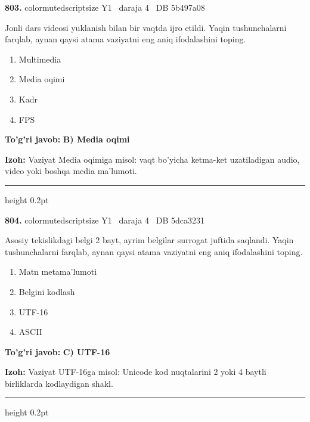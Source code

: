 \documentclass[10pt,a4paper,oneside]{article}
\begin{document}
\noindent\textbf{\color{ink}803.}  {color{muted}scriptsize Y1 \textbullet\ daraja 4 \textbullet\ DB 5b497a08}
\par
Jonli dars videosi yuklanish bilan bir vaqtda ijro etildi. Yaqin tushunchalarni farqlab, aynan qaysi atama vaziyatni eng aniq ifodalashini toping.
\begin{enumerate}[label=\Alph*),leftmargin=9mm]
\item Multimedia
\item Media oqimi
\item Kadr
\item FPS
\end{enumerate}
\begin{tcolorbox}[enhanced,breakable,colback=teal!4,colframe=teal!50!black,boxrule=0.5pt,arc=1.1mm,left=3mm,right=3mm,top=1.7mm,bottom=1.7mm,before skip=2mm,after skip=2mm]
\textbf{\color{teal}To'g'ri javob:} \textbf{B) Media oqimi}
\par\smallskip
\textbf{Izoh:} Vaziyat Media oqimiga misol: vaqt bo'yicha ketma-ket uzatiladigan audio, video yoki boshqa media ma'lumoti.
\end{tcolorbox}
\vspace{2mm}\hrule height 0.2pt \vspace{3mm}

\noindent\textbf{\color{ink}804.}  {color{muted}scriptsize Y1 \textbullet\ daraja 4 \textbullet\ DB 5dca3231}
\par
Asosiy tekislikdagi belgi 2 bayt, ayrim belgilar surrogat juftida saqlandi. Yaqin tushunchalarni farqlab, aynan qaysi atama vaziyatni eng aniq ifodalashini toping.
\begin{enumerate}[label=\Alph*),leftmargin=9mm]
\item Matn metama'lumoti
\item Belgini kodlash
\item UTF-16
\item ASCII
\end{enumerate}
\begin{tcolorbox}[enhanced,breakable,colback=teal!4,colframe=teal!50!black,boxrule=0.5pt,arc=1.1mm,left=3mm,right=3mm,top=1.7mm,bottom=1.7mm,before skip=2mm,after skip=2mm]
\textbf{\color{teal}To'g'ri javob:} \textbf{C) UTF-16}
\par\smallskip
\textbf{Izoh:} Vaziyat UTF-16ga misol: Unicode kod nuqtalarini 2 yoki 4 baytli birliklarda kodlaydigan shakl.
\end{tcolorbox}
\vspace{2mm}\hrule height 0.2pt \vspace{3mm}
\end{document}
